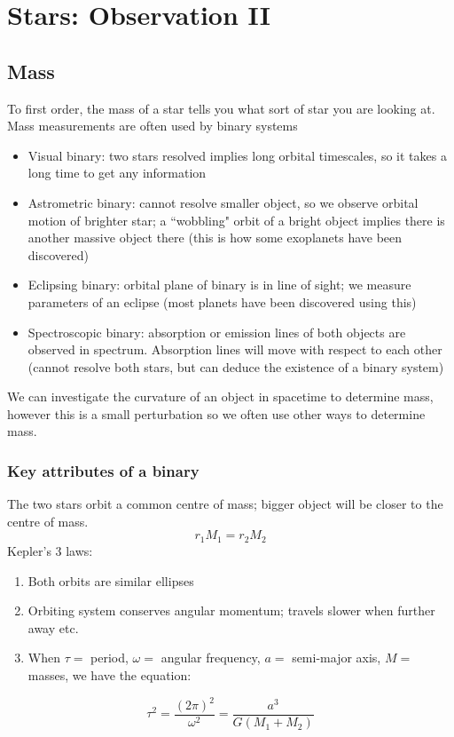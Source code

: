 \documentclass[a4paper]{article} %
\begin{document}
\section{Stars: Observation II}
\subsection{Mass}
To first order, the mass of a star tells you what sort of star you are looking at. Mass measurements are often used by binary systems
\begin{itemize}
\item Visual binary: two stars resolved implies long orbital timescales, so it takes a long time to get any information
\item Astrometric binary: cannot resolve smaller object, so we observe orbital motion of brighter star; a ``wobbling" orbit of a bright object implies there is another massive object there (this is how some exoplanets have been discovered)
\item Eclipsing binary: orbital plane of binary is in line of sight; we measure parameters of an eclipse (most planets have been discovered using this)
\item Spectroscopic binary: absorption or emission lines of both objects are observed in spectrum. Absorption lines will move with respect to each other (cannot resolve both stars, but can deduce the existence of a binary system)
\end{itemize}
We can investigate the curvature of an object in spacetime to determine mass, however this is a small perturbation so we often use other ways to determine mass.

\subsubsection{Key attributes of a binary}
The two stars orbit a common centre of mass; bigger object will be closer to the centre of mass.
\begin{equation}
r_1 M_1 = r_2 M_2
\end{equation}
Kepler's 3 laws:
\begin{enumerate}
\item Both orbits are similar ellipses
\item Orbiting system conserves angular momentum; travels slower when further away etc.
\item When $\tau=$ period, $\omega=$ angular frequency, $a=$ semi-major axis, $M=$ masses, we have the equation:
\end{enumerate}
\begin{equation}
\tau^2=\frac{(2\pi)^2}{\omega^2}=\frac{a^3}{G(M_1+M_2)}
\end{equation}
\end{document}
